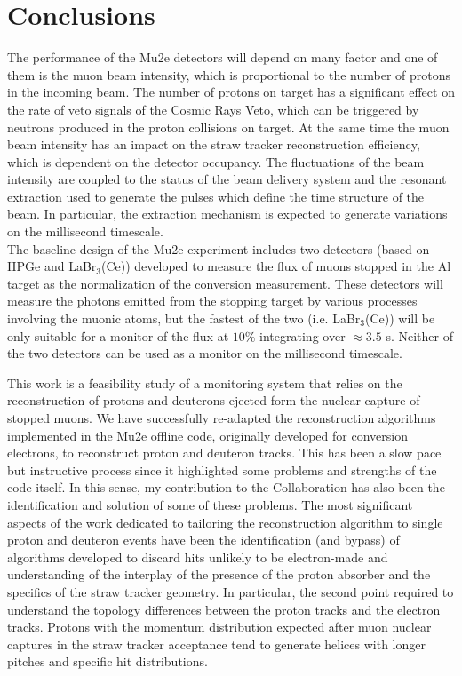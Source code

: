 \documentclass[12pt,a4paper,openright, oneside, titlepage]{book} %
\begin{document}
\chapter{Conclusions}
The performance of the Mu2e detectors will depend on many factor and one of them is the muon beam intensity, which is proportional to the number of protons in the incoming beam. 
The number of protons on target has a significant effect on the rate of veto signals of the Cosmic Rays Veto, which can be triggered by neutrons produced in the proton collisions on target. At the same time the muon beam intensity has an impact on the straw tracker reconstruction efficiency, which is dependent on the detector occupancy.
The fluctuations of the beam intensity are coupled to the status of the beam delivery system and the resonant extraction used to generate the pulses which define the time structure of the beam.
In particular, the extraction mechanism is expected to generate variations on the millisecond timescale.\\
The baseline design of the Mu2e experiment includes two detectors (based on HPGe and LaBr$_3$(Ce)) developed to measure the flux of muons stopped in the Al target as the normalization of the conversion measurement. 
These detectors will measure the photons emitted from the stopping target by various processes involving the muonic atoms, but the fastest of the two (i.e. LaBr$_3$(Ce)) will be only suitable for a monitor of the flux at $10\%$ integrating over $\approx 3.5$ s. 
Neither of the two detectors can be used as a monitor on the millisecond timescale.

\noindent
This work is a feasibility study of a monitoring system that relies on the reconstruction of protons and deuterons ejected form the nuclear capture of stopped muons.
We have successfully re-adapted the reconstruction algorithms implemented in the Mu2e offline code, originally developed for conversion electrons, to reconstruct proton and deuteron tracks.
This has been a slow pace but instructive process since it highlighted some problems and strengths of the code itself. 
In this sense, my contribution to the Collaboration has also been the identification and solution of some of these problems.
The most significant aspects of the work dedicated to tailoring the reconstruction algorithm to single proton and deuteron events have been the identification (and bypass) of algorithms developed to discard hits unlikely to be electron-made and understanding of the interplay of the presence of the proton absorber and the specifics of the straw tracker geometry.
In particular, the second point required to understand the topology differences between the proton tracks and the electron tracks. 
Protons with the momentum distribution expected after muon nuclear captures in the straw tracker acceptance tend to generate helices with longer pitches and specific hit distributions.
\end{document}
